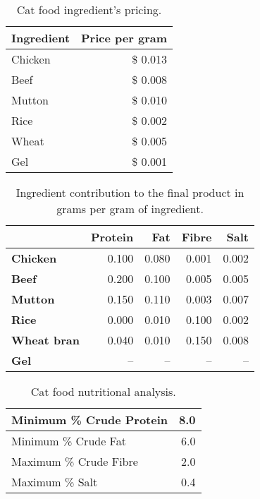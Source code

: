 \begin{table}
  \centering
  \begin{tabular}{| l | r |}
    \hline
    \textbf{Ingredient} & \textbf{Price per gram} \\ \hline
    Chicken & \$ 0.013 \\ \hline
    Beef & \$ 0.008 \\ \hline
    Mutton & \$ 0.010 \\ \hline
    Rice & \$ 0.002 \\ \hline
    Wheat & \$ 0.005 \\ \hline
    Gel & \$ 0.001 \\ \hline
  \end{tabular}
  \caption{Cat food ingredient's pricing.}
  \label{ampl:whiskas:prices}  
\end{table}

\begin{table}
  \centering
  \begin{tabular}{| l | r | r | r | r |}
    \hline
    & \textbf{Protein} & \textbf{Fat} & \textbf{Fibre} & \textbf{Salt} \\ \hline
    \textbf{Chicken} & 0.100 & 0.080 & 0.001 & 0.002 \\ \hline
    \textbf{Beef} & 0.200 & 0.100 & 0.005 & 0.005 \\ \hline
    \textbf{Mutton} & 0.150 & 0.110 & 0.003 & 0.007 \\ \hline
    \textbf{Rice} & 0.000 & 0.010 & 0.100 & 0.002 \\ \hline
    \textbf{Wheat bran} & 0.040 & 0.010 & 0.150 & 0.008 \\ \hline
    \textbf{Gel} & -- & -- & -- & -- \\ \hline
  \end{tabular}
  \caption{Ingredient contribution to the final product in grams per gram of ingredient.}
  \label{ampl:whiskas:contribution}  
\end{table}

\begin{table}
  \centering
  \begin{tabular}{| l | r |}
    \hline
    Minimum \% Crude Protein & 8.0 \\ \hline
    Minimum \% Crude Fat & 6.0 \\ \hline
    Maximum \% Crude Fibre & 2.0 \\ \hline
    Maximum \% Salt & 0.4 \\ \hline
  \end{tabular}
  \caption{Cat food nutritional analysis.}
  \label{ampl:whiskas:analysis}  
\end{table}


